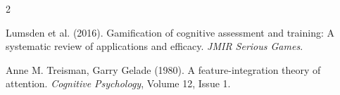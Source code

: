 \documentclass[12pt]{article}
\begin{document}


\begin{thebibliography}{2}

Lumsden et al. (2016).
Gamification of cognitive assessment and training: A systematic review of applications and efficacy.
\textit{JMIR Serious Games}.

Anne M. Treisman, Garry Gelade (1980).
A feature-integration theory of attention.
\textit{Cognitive Psychology}, Volume 12, Issue 1.



\end{thebibliography}
\end{document}
